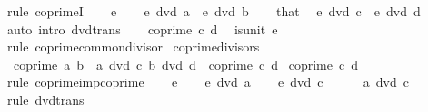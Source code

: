 \begin{isabellebody}
\ {\isacharparenleft}{\kern0pt}rule\ coprimeI{\isacharparenright}{\kern0pt}\isanewline
\ \ \isamarkupfalse%
\ e\isanewline
\ \ \isamarkupfalse%
\ {\isachardoublequoteopen}e\ dvd\ a{\isachardoublequoteclose}\ \ {\isachardoublequoteopen}e\ dvd\ b{\isachardoublequoteclose}\isanewline
\ \ \isamarkupfalse%
\ that\ \isamarkupfalse%
\ {\isachardoublequoteopen}e\ dvd\ c{\isachardoublequoteclose}\ \ {\isachardoublequoteopen}e\ dvd\ d{\isachardoublequoteclose}\isanewline
\ \ \ \ \isamarkupfalse%
\ {\isacharparenleft}{\kern0pt}auto\ intro{\isacharcolon}{\kern0pt}\ dvd{\isacharunderscore}{\kern0pt}trans{\isacharparenright}{\kern0pt}\isanewline
\ \ \isamarkupfalse%
\ {\isacartoucheopen}coprime\ c\ d{\isacartoucheclose}\ \isamarkupfalse%
\ {\isachardoublequoteopen}is{\isacharunderscore}{\kern0pt}unit\ e{\isachardoublequoteclose}\isanewline
\ \ \ \ \isamarkupfalse%
\ {\isacharparenleft}{\kern0pt}rule\ coprime{\isacharunderscore}{\kern0pt}common{\isacharunderscore}{\kern0pt}divisor{\isacharparenright}{\kern0pt}\isanewline
{}\isamarkupfalse%
%
\endisatagproof
{\isafoldproof}%
%
\isadelimproof
\isanewline
%
\endisadelimproof
\isanewline
{}\isamarkupfalse%
\ coprime{\isacharunderscore}{\kern0pt}divisors{\isacharcolon}{\kern0pt}\isanewline
\ \ {\isachardoublequoteopen}coprime\ a\ b{\isachardoublequoteclose}\ \ {\isachardoublequoteopen}a\ dvd\ c{\isachardoublequoteclose}\ {\isachardoublequoteopen}b\ dvd\ d{\isachardoublequoteclose}\ \ {\isachardoublequoteopen}coprime\ c\ d{\isachardoublequoteclose}\isanewline
%
\isadelimproof
%
\endisadelimproof
%
\isatagproof
{}\isamarkupfalse%
\ {\isacartoucheopen}coprime\ c\ d{\isacartoucheclose}\ \isamarkupfalse%
\ {\isacharparenleft}{\kern0pt}rule\ coprime{\isacharunderscore}{\kern0pt}imp{\isacharunderscore}{\kern0pt}coprime{\isacharparenright}{\kern0pt}\isanewline
\ \ \isamarkupfalse%
\ e\isanewline
\ \ \isamarkupfalse%
\ {\isachardoublequoteopen}e\ dvd\ a{\isachardoublequoteclose}\ \isamarkupfalse%
\ \isamarkupfalse%
\ {\isachardoublequoteopen}e\ dvd\ c{\isachardoublequoteclose}\isanewline
\ \ \ \ \isamarkupfalse%
\ {\isacartoucheopen}a\ dvd\ c{\isacartoucheclose}\ \isamarkupfalse%
\ {\isacharparenleft}{\kern0pt}rule\ dvd{\isacharunderscore}{\kern0pt}trans{\isacharparenright}{\kern0pt}\isanewline

\end{isabellebody}

